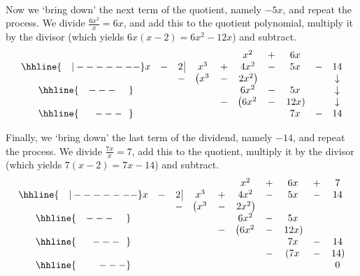 \begin{ex}
\begin{enumerate}
\[\begin{array}{cccccccccc}
\end{array}\]

\setlength\arraycolsep{5pt}
\setlength\extrarowheight{0pt} 

Now we `bring down' the next term of the quotient, namely $-5x$, and repeat the process. We divide $\frac{6x^2}{x} = 6x$, and add this to the quotient polynomial, multiply it by the divisor (which yields $6x(x - 2) = 6x^{2} - 12x$) and subtract. \setlength\arraycolsep{0.1pt}\setlength\extrarowheight{2pt}\[ \begin{array}{cccccccccc}

& & & & & x^2 & + & 6x &  &  \\ \hhline{~~~|-------}

x & - & 2 \, \vline& x^3 & + & 4x^2 & - & 5x & - & 14 \\

 &  &  -& \left(x^3 \right. & - & \left.  2x^2\right) &  & &  & \downarrow  \\ \hhline{~~~---~~~~} 
 &  &  &   &  & 6 x^2 & - & 5x &  &  \downarrow \\ 
 &  &  &   & - & \left(6 x^2 \right. & - & \left. 12x \right) &  & \downarrow \\ \hhline{~~~~~---~~} 
 &  &  &   &   &  & & 7x  & - & 14 \\
 
\end{array}\]

\setlength\arraycolsep{5pt}
\setlength\extrarowheight{0pt}

Finally, we `bring down' the last term of the dividend, namely $-14$, and repeat the process.  We divide $\frac{7x}{x} = 7$, add this to the quotient, multiply it by the divisor (which yields $7(x - 2) = 7x - 14$) and subtract.\setlength\arraycolsep{0.1pt}\setlength\extrarowheight{2pt}\[ \begin{array}{cccccccccc}

& & & & & x^2 & + & 6x & + & 7 \\ \hhline{~~~|-------}

x & - & 2 \, \vline& x^3 & + & 4x^2 & - & 5x & - & 14 \\

 &  &  -& \left(x^3 \right. & - & \left.  2x^2\right) &  &  &  &  \\ \hhline{~~~---~~~~} 
 &  &  &   &  & 6 x^2 & - & 5x &  &  \\ 
 &  &  &   & - & \left(6 x^2 \right. & - & \left. 12x \right) &  &  \\ \hhline{~~~~~---~~} 
 &  &  &   &   &  & & 7x  & - & 14 \\
 &  &  &   &   &  & - & \left( 7x \right. & - & \left. 14 \right) \\ \hhline{~~~~~~~---} 
 &   &  &  &  &  &  &  &  & 0
 

\end{array}\]
\end{enumerate}
\end{ex}
